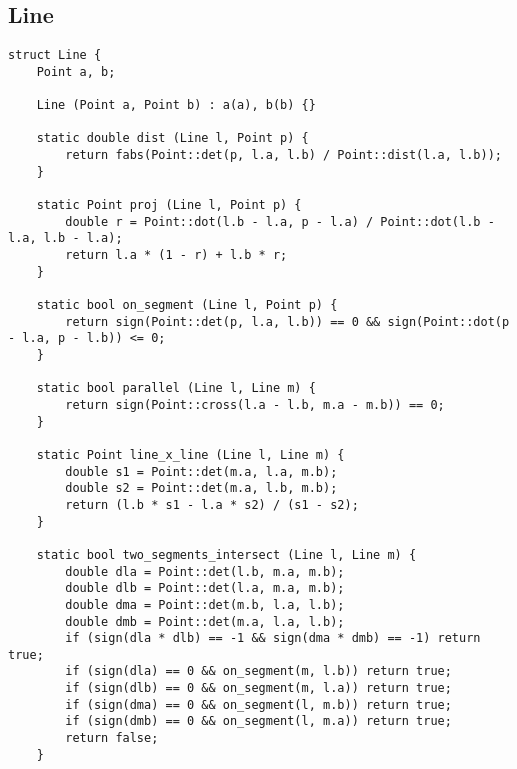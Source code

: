 \documentclass[10pt,landscape]{article}
\begin{document}
\begin{multicols}{2}
\subsection{Line}
\begin{lstlisting}
struct Line {
	Point a, b;

	Line (Point a, Point b) : a(a), b(b) {}

	static double dist (Line l, Point p) {
		return fabs(Point::det(p, l.a, l.b) / Point::dist(l.a, l.b));
	}

	static Point proj (Line l, Point p) {
		double r = Point::dot(l.b - l.a, p - l.a) / Point::dot(l.b - l.a, l.b - l.a);
		return l.a * (1 - r) + l.b * r;
	}

	static bool on_segment (Line l, Point p) {
		return sign(Point::det(p, l.a, l.b)) == 0 && sign(Point::dot(p - l.a, p - l.b)) <= 0;
	}

	static bool parallel (Line l, Line m) {
		return sign(Point::cross(l.a - l.b, m.a - m.b)) == 0;
	}

	static Point line_x_line (Line l, Line m) {
		double s1 = Point::det(m.a, l.a, m.b);
		double s2 = Point::det(m.a, l.b, m.b);
		return (l.b * s1 - l.a * s2) / (s1 - s2);
	}

	static bool two_segments_intersect (Line l, Line m) {
		double dla = Point::det(l.b, m.a, m.b);
		double dlb = Point::det(l.a, m.a, m.b);
		double dma = Point::det(m.b, l.a, l.b);
		double dmb = Point::det(m.a, l.a, l.b);
		if (sign(dla * dlb) == -1 && sign(dma * dmb) == -1) return true;
		if (sign(dla) == 0 && on_segment(m, l.b)) return true;
		if (sign(dlb) == 0 && on_segment(m, l.a)) return true;
		if (sign(dma) == 0 && on_segment(l, m.b)) return true;
		if (sign(dmb) == 0 && on_segment(l, m.a)) return true;
		return false;
	}


\end{lstlisting}
\end{multicols}
\end{document}
